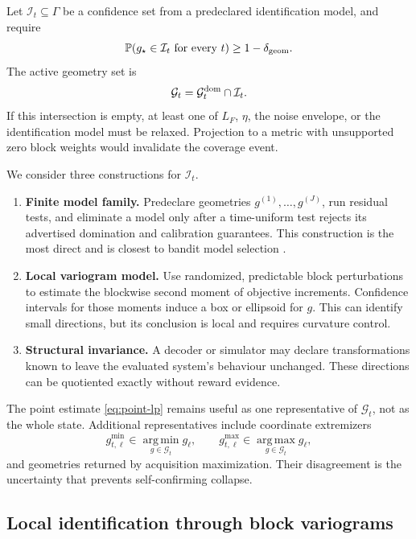 \documentclass[11pt]{article}
\theoremstyle{definition}
\theoremstyle{remark}
\newcommand{\Gg}{\mathcal G}
\newcommand{\Ii}{\mathcal I}
\newcommand{\Pp}{\mathbb P}
\newcommand{\1}{\mathbf 1}
\newcommand{\argmax}{\operatorname*{arg\,max}}
\newcommand{\argmin}{\operatorname*{arg\,min}}
\begin{document}
Let $\Ii_t\subseteq\Gamma$ be a confidence set from a predeclared identification model, and require
\begin{equation}\label{eq:id-coverage}
  \Pp(g_\star\in\Ii_t\text{ for every }t)\ge1-\delta_{\rm geom}.
\end{equation}
The active geometry set is
\begin{equation}\label{eq:active-set}
  \Gg_t=\Gg_t^{\rm dom}\cap\Ii_t.
\end{equation}
If this intersection is empty, at least one of $L_F$, $\eta$, the noise envelope, or the
identification model must be relaxed.  Projection to a metric with unsupported zero block weights
would invalidate the coverage event.

We consider three constructions for $\Ii_t$.
\begin{enumerate}
\item \textbf{Finite model family.}  Predeclare geometries
$g^{(1)},\ldots,g^{(J)}$, run residual tests, and eliminate a model only after a time-uniform test
rejects its advertised domination and calibration guarantees.  This construction is the most direct
and is closest to bandit model selection \cite{DynamicBalancing}.
\item \textbf{Local variogram model.}  Use randomized, predictable block perturbations to estimate
the blockwise second moment of objective increments.  Confidence intervals for those moments induce
a box or ellipsoid for $g$.  This can identify small directions, but its conclusion is local and
requires curvature control.
\item \textbf{Structural invariance.}  A decoder or simulator may declare transformations known to
leave the evaluated system's behaviour unchanged.  These directions can be quotiented exactly without reward
evidence.
\end{enumerate}

The point estimate \eqref{eq:point-lp} remains useful as one representative of $\Gg_t$, not as the
whole state.  Additional representatives include coordinate extremizers
\[
  g_{t,\ell}^{\min}\in\argmin_{g\in\Gg_t}g_\ell,
  \qquad
  g_{t,\ell}^{\max}\in\argmax_{g\in\Gg_t}g_\ell,
\]
and geometries returned by acquisition maximization.  Their disagreement is the uncertainty that
prevents self-confirming collapse.

\subsection{Local identification through block variograms}
\end{document}
